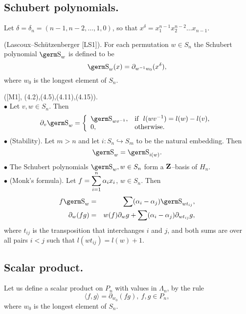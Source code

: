 {\subsection{Schubert polynomials.}

Let $\delta =\delta_n=(n-1,n-2,\ldots ,1,0)$, so that 
$x^{\delta}=x_1^{n-1}x_2^{n-2}\ldots x_{n-1}$.

\begin{de} (Lascoux--Sch\"utzenberger [LS1]).
 For each permutation \hbox{$w\in S_n$} the Schubert polynomial 
 ${\s}_w$ is defined to be 
 $${\s}_w(x)=\partial_{w^{-1}w_0}(x^{\delta}),
 $$
where $w_0$ is the longest element of $S_n$.
 \end{de}

\begin{pr} ([M1], (4.2),(4.5),(4.11),(4.15)).\\
$\bullet$ Let $v,w\in S_n$. Then 
$$\partial_v\s_w=\left\{\begin{array}{ll}
                        \s_{wv^{-1}}, & \mbox{\rm if \ $l(wv^{-1})=l(w)-l(v)$,}\\
                        0, & \mbox{\rm otherwise}.
\end{array}\right.
$$
$\bullet$ (Stability). Let $m>n$ and let $i:S_n\hookrightarrow S_m$ to be the 
natural embedding. Then
$$\s_w=\s_{i(w)}.
$$
$\bullet$ The Schubert polynomials $\s_w, w\in S_n$ form a ${\bf 
Z}$--basis of $H_n$.\\
$\bullet$ (Monk's formula). Let $f=\displaystyle\sum_{i=1}^n\alpha_ix_i$, 
$w\in S_n$. Then
\begin{eqnarray*}f\s_w &=&\sum (\alpha_i-\alpha_j)\s_{wt_{ij}},\\
\partial_w(fg) &=& w(f)\partial_wg+\sum (\al_i-\al_j)\partial_{wt_{ij}}g,
\end{eqnarray*}
where $t_{ij}$ is the transposition that interchanges $i$ and $j$, and both 
sums are over all pairs $i<j$ such that $l(wt_{ij})=l(w)+1$.
\end{pr}

\subsection{Scalar product.}

Let us define a scalar product on $P_n$ with values in $\Lambda_n$, by 
the rule
\begin{equation}
\langle f,g\rangle =\partial_{w_0}(fg),~f,g\in P_n,\label{100}
\end{equation}
where $w_0$ is the longest element of $S_n$.

}
